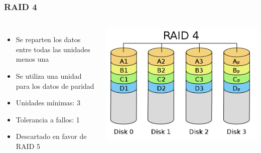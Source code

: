 \documentclass[aspectratio=169]{beamer}
\begin{document}
\begin{frame}
  \frametitle{RAID 4}
  \begin{columns}
    \begin{itemize}
    \item Se reparten los datos entre todas las unidades menos una
    \item Se utiliza una unidad para los datos de paridad
    \item Unidades mínimas: 3
    \item Tolerancia a fallos: 1
    \item Descartado en favor de RAID 5
    \end{itemize}
    \includegraphics[width=\textwidth]{img/RAID4}
  \end{columns}
  
\end{frame}
\end{document}
